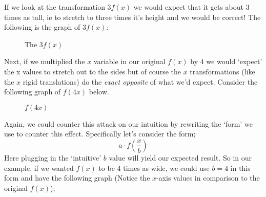 \documentclass{ximera}
\begin{document}
    If we look at the transformation $3f(x)$ we would expect that it gets about 3 times as tall, ie to stretch to three times it's height and we would be correct! The following is the graph of $3f(x)$:
    
    \begin{figure}[H]\centering
        \caption{The $3 f(x)$}
    \end{figure}
    
    Next, if we multiplied the $x$ variable in our original $f(x)$ by 4 we would `expect' the x values to stretch out to the sides but of course the $x$ transformations (like the $x$ rigid translations) do the \textit{exact opposite} of what we'd expect. Consider the following graph of $f(4x)$ below.
    
    \begin{figure}[H]\centering
        \caption{$f(4x)$}
    \end{figure}
    
    Again, we could counter this attack on our intuition by rewriting the `form' we use to counter this effect. Specifically let's consider the form;
    \[
        a\cdot f\left(\frac{x}{b}\right)
    \]
    Here plugging in the `intuitive' $b$ value will yield our expected result. So in our example, if we wanted $f(x)$ to be 4 times as wide, we could use $b = 4$ in this form and have the following graph (Notice the $x$-axis values in comparison to the original $f(x)$);
    
\end{document}
